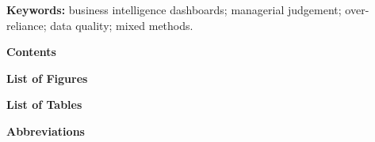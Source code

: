 \documentclass[12pt,a4paper]{article}
\begin{document}
\vspace{10pt}
{\bfseries Keywords:} business intelligence dashboards; managerial judgement; over-reliance; data quality;
mixed methods.

\newpage
\begin{center}{\large\bfseries Contents}\end{center}
\vspace{6pt}
\makeatletter
{\setlength{\parskip}{0pt}
\renewcommand{\@dotsep}{2.5}
\setcounter{tocdepth}{2}
\par}

\newpage
\begin{center}{\large\bfseries List of Figures}\end{center}
\vspace{6pt}
{\setlength{\parskip}{0pt}\par}

\newpage
\begin{center}{\large\bfseries List of Tables}\end{center}
\vspace{6pt}
{\setlength{\parskip}{0pt}\par}
\makeatother

\newpage
\begin{center}{\large\bfseries Abbreviations}\end{center}
\vspace{10pt}
\end{document}
